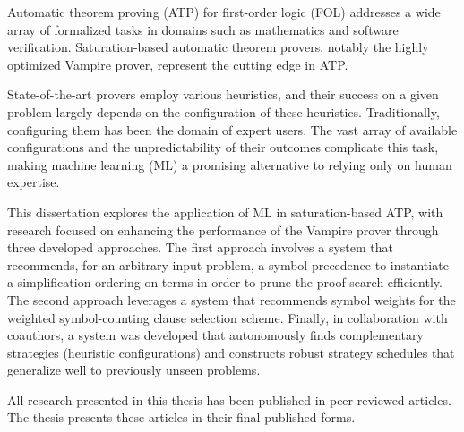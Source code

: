 Automatic theorem proving (ATP) for first-order logic (FOL) addresses a wide array of formalized tasks in domains such as mathematics and software verification. Saturation-based automatic theorem provers, notably the highly optimized Vampire prover, represent the cutting edge in ATP.

State-of-the-art provers employ various heuristics, and their success on a given problem largely depends on the configuration of these heuristics. Traditionally, configuring them has been the domain of expert users. The vast array of available configurations and the unpredictability of their outcomes complicate this task, making machine learning (ML) a promising alternative to relying only on human expertise.

This dissertation explores the application of ML in saturation-based ATP, with research focused on enhancing the performance of the Vampire prover through three developed approaches. The first approach involves a system that recommends, for an arbitrary input problem, a symbol precedence to instantiate a simplification ordering on terms in order to prune the proof search efficiently. The second approach leverages a system that recommends symbol weights for the weighted symbol-counting clause selection scheme. Finally, in collaboration with coauthors, a system was developed that autonomously finds complementary strategies (heuristic configurations) and constructs robust strategy schedules that generalize well to previously unseen problems.

All research presented in this thesis has been published in peer-reviewed articles. The thesis presents these articles in their final published forms.
